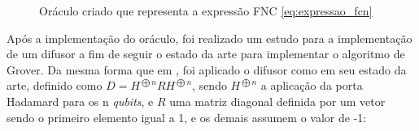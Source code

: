 \documentclass[12pt]{article}
\begin{document}
\begin{figure}[ht]
\centering
{}
\caption{Oráculo criado que representa a expressão FNC \ref{eq:expressao_fcn}}
\label{fig:oraculo_final}
\end{figure}

Após a implementação do oráculo, foi realizado um estudo para a implementação de um difusor a fim de seguir o estado da arte para implementar o algoritmo de Grover.
Da mesma forma que em \cite{gamberi:22}, foi aplicado o difusor como em seu estado da arte, definido como $D = {H}^{{\bigoplus}n} R {H}^{{\bigoplus}n}$, sendo ${H}^{{\bigoplus}n}$ a aplicação da porta Hadamard para os n \textit{qubits}, e $R$ uma matriz diagonal definida por um vetor sendo o primeiro elemento igual a 1, e os demais assumem o valor de -1:
\end{document}
